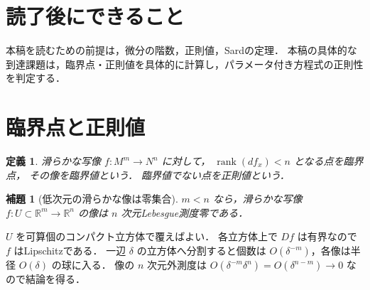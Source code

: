 \documentclass[a5paper,10pt,onecolumn]{jsarticle}
\makeatletter
\theoremstyle{mathnotetheorem}
\newtheorem{definition}[theorem]{定義}
\newtheorem{lemma}[theorem]{補題}
\renewcommand{\proofname}{証明}
\renewenvironment{proof}[1][\proofname]{%
  \par\pushQED{\qed}\normalfont\topsep4\p@\@plus2\p@\relax
  \trivlist\item[\hskip\labelsep\bfseries #1]\ignorespaces
}{\popQED\endtrivlist\@endpefalse}
\makeatother
\begin{document}
\section*{読了後にできること}
本稿を読むための前提は，微分の階数，正則値，Sardの定理．
本稿の具体的な到達課題は，臨界点・正則値を具体的に計算し，パラメータ付き方程式の正則性を判定する．


\section{臨界点と正則値}
\begin{definition}
滑らかな写像 $f:M^m\to N^n$ に対して，
$\operatorname{rank}(df_x)<n$ となる点を臨界点，
その像を臨界値という．
臨界値でない点を正則値という．
\end{definition}
\begin{lemma}[低次元の滑らかな像は零集合]
$m<n$ なら，滑らかな写像
$f:U\subset\mathbb R^m\to\mathbb R^n$ の像は
$n$ 次元Lebesgue測度零である．
\end{lemma}
\begin{proof}
$U$ を可算個のコンパクト立方体で覆えばよい．
各立方体上で $Df$ は有界なので $f$ はLipschitzである．
一辺 $\delta$ の立方体へ分割すると個数は
$O(\delta^{-m})$，各像は半径 $O(\delta)$ の球に入る．
像の $n$ 次元外測度は
$O(\delta^{-m}\delta^n)=O(\delta^{n-m})\to0$ なので結論を得る．
\end{proof}
\end{document}
